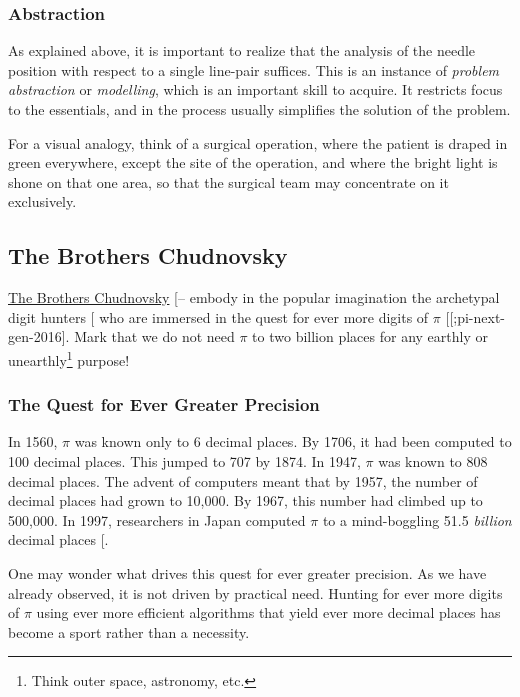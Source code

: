 \documentclass[
  a4paper,
]{article}
\begin{document}
\subsubsection{Abstraction}\label{abstraction}

As explained above, it is important to realize that the analysis of the
needle position with respect to a single line-pair suffices. This is an
instance of \emph{problem abstraction} or \emph{modelling}, which is an
important skill to acquire. It restricts focus to the essentials, and in
the process usually simplifies the solution of the problem.

For a visual analogy, think of a surgical operation, where the patient
is draped in green everywhere, except the site of the operation, and
where the bright light is shone on that one area, so that the surgical
team may concentrate on it exclusively.

\subsection{The Brothers Chudnovsky}\label{the-brothers-chudnovsky}

\href{https://en.wikipedia.org/wiki/Chudnovsky_brothers}{The Brothers
Chudnovsky}
{[}--\citeproc{ref-pi-next-gen-2016}{44}{]}
embody in the popular imagination the archetypal digit hunters
{[}\citeproc{ref-beautiful-geometry-2014}{45}{]} who are immersed in the
quest for ever more digits of \(\pi\)
{[}{[}\citeproc{ref-blatner-1997}{46}{]};pi-next-gen-2016{]}. Mark that
we do not need \(\pi\) to two billion places for any earthly or
unearthly\footnote{Think outer space, astronomy, etc.} purpose!

\subsubsection{The Quest for Ever Greater
Precision}\label{the-quest-for-ever-greater-precision}

In 1560, \(\pi\) was known only to 6 decimal places. By 1706, it had
been computed to 100 decimal places. This jumped to 707 by 1874. In
1947, \(\pi\) was known to 808 decimal places. The advent of computers
meant that by 1957, the number of decimal places had grown to 10,000. By
1967, this number had climbed up to 500,000. In 1997, researchers in
Japan computed \(\pi\) to a mind-boggling 51.5 \emph{billion} decimal
places {[}\citeproc{ref-banks-1999}{47}{]}.

One may wonder what drives this quest for ever greater precision. As we
have already observed, it is not driven by practical need. Hunting for
ever more digits of \(\pi\) using ever more efficient algorithms that
yield ever more decimal places has become a sport rather than a
necessity.
\end{document}
